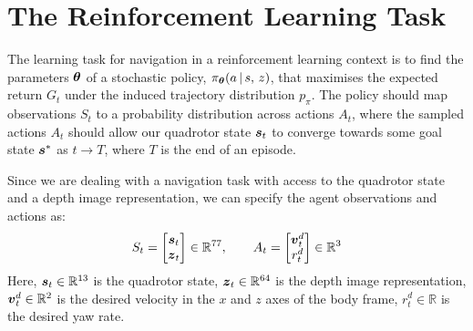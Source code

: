 \section{The Reinforcement Learning Task}
\label{sec:4_reinforcement_learning_task}
The learning task for navigation in a reinforcement learning context is to find the parameters $\boldsymbol{\theta}$ of a stochastic policy, $\pi_{\boldsymbol{\theta}} (a \, | \, s, \, z)$, that maximises the expected return $G_t$ under the induced trajectory distribution $p_\pi$. The policy should map observations $S_t$ to a probability distribution across actions $A_t$, where the sampled actions $A_t$ should allow our quadrotor state ${\boldsymbol{s}}_t$ to converge towards some goal state ${\boldsymbol{s}}^*$ as $t \rightarrow T$, where $T$ is the end of an episode.

Since we are dealing with a navigation task with access to the quadrotor state and a depth image representation, we can specify the agent observations and actions as:
\begin{equation}
    S_t = 
    \begin{bmatrix}
    {\boldsymbol{s}}_t \\
    {\boldsymbol{z}}_t
    \end{bmatrix} \in \mathbb{R}^{77}, \qquad
    A_t = 
    \begin{bmatrix}
    {\boldsymbol{v}}^d_t \\
    r^d_t
    \end{bmatrix} \in \mathbb{R}^{3}
    \label{eq:4_state_action_space}
\end{equation}
Here, ${\boldsymbol{s}}_t \in \mathbb{R}^{13}$ is the quadrotor state, ${\boldsymbol{z}}_t \in \mathbb{R}^{64}$ is the depth image representation, ${\boldsymbol{v}}^d_t \in \mathbb{R}^2$ is the desired velocity in the $x$ and $z$ axes of the body frame, $r_t^d \in \mathbb{R}$ is the desired yaw rate. 

